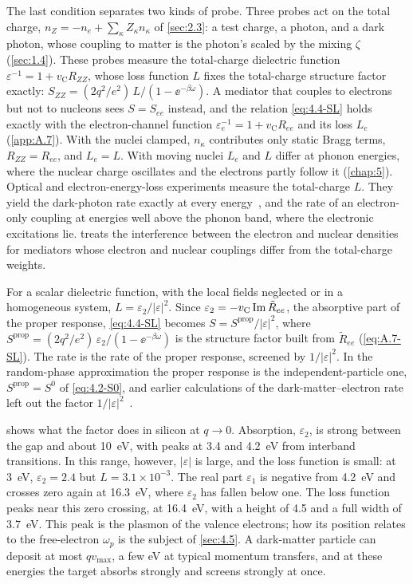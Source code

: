 The last condition separates two kinds of probe. Three probes act on the total charge, $n_Z = -n_e + \sum_\kappa Z_\kappa n_\kappa$ of \cref{sec:2.3}: a test charge, a photon, and a dark photon, whose coupling to matter is the photon's scaled by the mixing $\zeta$ (\cref{sec:1.4}). These probes measure the total-charge dielectric function $\varepsilon^{-1} = 1 + v_{\mathrm{C}}R_{ZZ}$, whose loss function $L$ fixes the total-charge structure factor exactly: $S_{ZZ} = (2q^2/e^2)\,L/(1 - \ee^{-\beta\omega})$. A mediator that couples to electrons but not to nucleons sees $S = S_{ee}$ instead, and the relation \cref{eq:4.4-SL} holds exactly with the electron-channel function $\varepsilon_e^{-1} = 1 + v_{\mathrm{C}}R_{ee}$ and its loss $L_e$ (\cref{app:A.7}). With the nuclei clamped, $n_\kappa$ contributes only static Bragg terms, $R_{ZZ} = R_{ee}$, and $L_e = L$. With moving nuclei $L_e$ and $L$ differ at phonon energies, where the nuclear charge oscillates and the electrons partly follow it (\cref{chap:5}). Optical and electron-energy-loss experiments measure the total-charge $L$. They yield the dark-photon rate exactly at every energy~\cite{hochberg2021determining}, and the rate of an electron-only coupling at energies well above the phonon band, where the electronic excitations lie.  treats the interference between the electron and nuclear densities for mediators whose electron and nuclear couplings differ from the total-charge weights.

For a scalar dielectric function, with the local fields neglected or in a homogeneous system, $L = \varepsilon_2/|\varepsilon|^2$. Since $\varepsilon_2 = -v_{\mathrm{C}}\operatorname{Im}\tilde R_{ee}$, the absorptive part of the proper response, \cref{eq:4.4-SL} becomes $S = S^{\mathrm{prop}}/|\varepsilon|^2$, where $S^{\mathrm{prop}} = (2q^2/e^2)\,\varepsilon_2/(1 - \ee^{-\beta\omega})$ is the structure factor built from $\tilde R_{ee}$ (\cref{eq:A.7-SL}). The rate is the rate of the proper response, screened by $1/|\varepsilon|^2$. In the random-phase approximation the proper response is the independent-particle one, $S^{\mathrm{prop}} = S^0$ of \cref{eq:4.2-S0}, and earlier calculations of the dark-matter--electron rate left out the factor $1/|\varepsilon|^2$~\cite{knapen2021dark}.

 shows what the factor does in silicon at $q \to 0$. Absorption, $\varepsilon_2$, is strong between the gap and about \SI{10}{eV}, with peaks at 3.4 and \SI{4.2}{eV} from interband transitions. In this range, however, $|\varepsilon|$ is large, and the loss function is small: at \SI{3}{eV}, $\varepsilon_2 = 2.4$ but $L = 3.1\times10^{-3}$. The real part $\varepsilon_1$ is negative from \SI{4.2}{eV} and crosses zero again at \SI{16.3}{eV}, where $\varepsilon_2$ has fallen below one. The loss function peaks near this zero crossing, at \SI{16.4}{eV}, with a height of 4.5 and a full width of \SI{3.7}{eV}. This peak is the plasmon of the valence electrons; how its position relates to the free-electron $\omega_p$ is the subject of \cref{sec:4.5}. A dark-matter particle can deposit at most $qv_{\mathrm{max}}$, a few eV at typical momentum transfers, and at these energies the target absorbs strongly and screens strongly at once.

